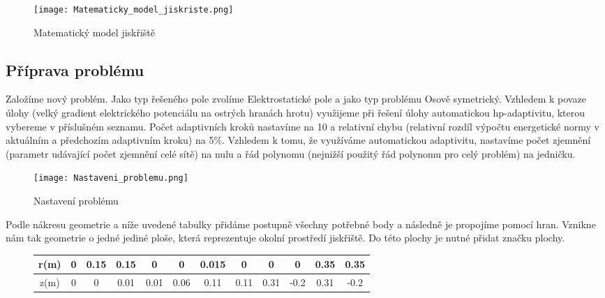 \documentclass[a4paper, oneside]{article}
\begin{document}
\begin{figure}[htbp]
\centering
\texttt{[image: Matematicky\_model\_jiskriste.png]}\\
\caption{Matematický model jiskřiště}
\end{figure}

\subsection{Příprava problému}
Založíme nový problém. Jako typ řešeného pole zvolíme Elektrostatické pole a jako typ problému Osově symetrický. Vzhledem k povaze úlohy (velký gradient elektrického potenciálu na ostrých hranách hrotu) využijeme při řešení úlohy automatickou hp-adaptivitu, kterou vybereme v příslušném seznamu. Počet adaptivních kroků nastavíme na 10 a relativní chybu (relativní rozdíl výpočtu energetické normy v aktuálním a předchozím adaptivním kroku) na 5\%. Vzhledem k tomu, že využíváme automatickou adaptivitu, nastavíme počet zjemnění (parametr udávající počet zjemnění celé sítě) na nulu a řád polynomu (nejnižší použitý řád polynomu pro celý problém) na jedničku.\\

\begin{figure}[htbp]
\centering
\texttt{[image: Nastaveni\_problemu.png]}\\
\caption{Nastavení problému}
\end{figure}

Podle nákresu geometrie a níže uvedené tabulky přidáme postupně všechny potřebné body a následně je propojíme pomocí hran. Vznikne nám tak geometrie o jedné jediné ploše, která reprezentuje okolní prostředí jiskřiště. Do této plochy je nutné přidat značku plochy.\\

\begin{figure}[htbp]
\centering
	
\begin{tabular}{|c|c|c|c|c|c|c|c|c|c|c|c|}
\hline
r(m) & 0 & 0.15 & 0.15 & 0 & 0 & 0.015 & 0 & 0 & 0 & 0.35 & 0.35\\
\hline
z(m) & 0 & 0 & 0.01 & 0.01 & 0.06 & 0.11 & 0.11 & 0.31 & -0.2 & 0.31 & -0.2\\
\hline 
\end{tabular} \\
\end{figure}
\end{document}
